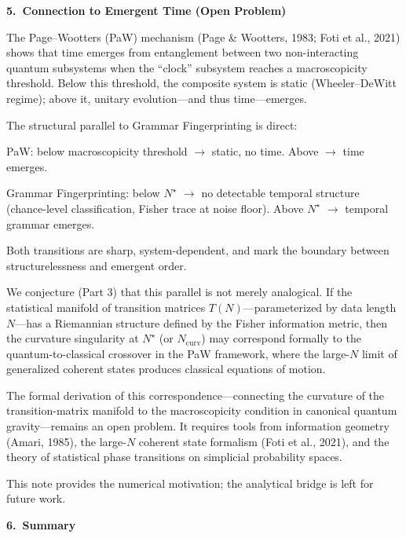 \documentclass[11pt,a4paper]{article}
\begin{document}
\vspace{0.5em}
\textbf{5.\ Connection to Emergent Time (Open Problem)}

The Page--Wootters (PaW) mechanism (Page \& Wootters, 1983; Foti et al., 2021) shows that time emerges from entanglement between two non-interacting quantum subsystems when the ``clock'' subsystem reaches a macroscopicity threshold. Below this threshold, the composite system is static (Wheeler--DeWitt regime); above it, unitary evolution---and thus time---emerges.

The structural parallel to Grammar Fingerprinting is direct:

PaW: below macroscopicity threshold $\rightarrow$ static, no time. Above $\rightarrow$ time emerges.

Grammar Fingerprinting: below $N^\star$ $\rightarrow$ no detectable temporal structure (chance-level classification, Fisher trace at noise floor). Above $N^\star$ $\rightarrow$ temporal grammar emerges.

Both transitions are sharp, system-dependent, and mark the boundary between structurelessness and emergent order.

We conjecture (Part 3) that this parallel is not merely analogical. If the statistical manifold of transition matrices $T(N)$---parameterized by data length $N$---has a Riemannian structure defined by the Fisher information metric, then the curvature singularity at $N^\star$ (or $N_{\mathrm{curv}}$) may correspond formally to the quantum-to-classical crossover in the PaW framework, where the large-$N$ limit of generalized coherent states produces classical equations of motion.

The formal derivation of this correspondence---connecting the curvature of the transition-matrix manifold to the macroscopicity condition in canonical quantum gravity---remains an open problem. It requires tools from information geometry (Amari, 1985), the large-$N$ coherent state formalism (Foti et al., 2021), and the theory of statistical phase transitions on simplicial probability spaces.

This note provides the numerical motivation; the analytical bridge is left for future work.

\vspace{0.5em}
\textbf{6.\ Summary}
\end{document}
